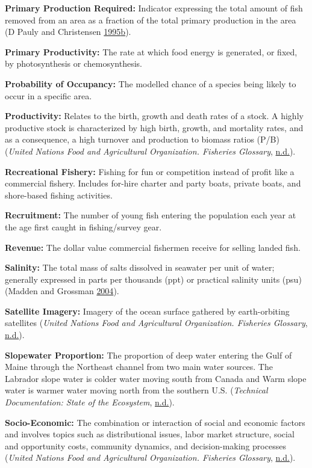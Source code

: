 \documentclass[
]{book}
\begin{document}
\textbf{Primary Production Required:}
Indicator expressing the total amount of fish removed from an area as a fraction of the total primary production in the area (D Pauly and Christensen \protect\hyperlink{ref-pauly1995}{1995}\protect\hyperlink{ref-pauly1995}{b}).

\textbf{Primary Productivity:}
The rate at which food energy is generated, or fixed, by photosynthesis or chemosynthesis.

\textbf{Probability of Occupancy:}
The modelled chance of a species being likely to occur in a specific area.

\textbf{Productivity:}
Relates to the birth, growth and death rates of a stock. A highly productive stock is characterized by high birth, growth, and mortality rates, and as a consequence, a high turnover and production to biomass ratios (P/B) (\emph{United Nations Food and Agricultural Organization. Fisheries Glossary}, \protect\hyperlink{ref-unfao}{n.d.}).

\textbf{Recreational Fishery:}
Fishing for fun or competition instead of profit like a commercial fishery. Includes for-hire charter and party boats, private boats, and shore-based fishing activities.

\textbf{Recruitment:}
The number of young fish entering the population each year at the age first caught in fishing/survey gear.

\textbf{Revenue:}
The dollar value commercial fishermen receive for selling landed fish.

\textbf{Salinity:}
The total mass of salts dissolved in seawater per unit of water; generally expressed in parts per thousands (ppt) or practical salinity units (psu) (Madden and Grossman \protect\hyperlink{ref-madden2004}{2004}).

\textbf{Satellite Imagery:}
Imagery of the ocean surface gathered by earth-orbiting satellites (\emph{United Nations Food and Agricultural Organization. Fisheries Glossary}, \protect\hyperlink{ref-unfao}{n.d.}).

\textbf{Slopewater Proportion:}
The proportion of deep water entering the Gulf of Maine through the Northeast channel from two main water sources. The Labrador slope water is colder water moving south from Canada and Warm slope water is warmer water moving north from the southern U.S. (\emph{Technical Documentation: State of the Ecosystem}, \protect\hyperlink{ref-techdoc}{n.d.}).

\textbf{Socio-Economic:}
The combination or interaction of social and economic factors and involves topics such as distributional issues, labor market structure, social and opportunity costs, community dynamics, and decision-making processes (\emph{United Nations Food and Agricultural Organization. Fisheries Glossary}, \protect\hyperlink{ref-unfao}{n.d.}).
\end{document}
